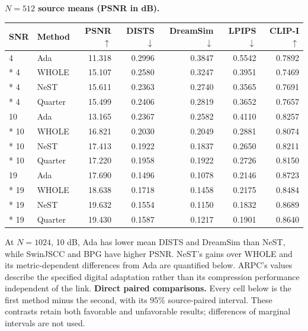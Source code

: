 \documentclass[10pt,letterpaper]{article}
\begin{document}
\textbf{$N=512$ source means (PSNR in dB).}\par
{\small\setlength{\tabcolsep}{3pt}\renewcommand{\arraystretch}{1.08}
\begin{longtable}{@{}llrrrrr@{}}\toprule
SNR & Method & PSNR $\uparrow$ & DISTS $\downarrow$ & DreamSim $\downarrow$ & LPIPS $\downarrow$ & CLIP-I $\uparrow$\\\midrule\endhead
4 & Ada & 11.318 & 0.2996 & 0.3847 & 0.5542 & 0.7892\\*
4 & WHOLE & 15.107 & 0.2580 & 0.3247 & 0.3951 & 0.7469\\*
4 & NeST & 15.611 & 0.2363 & 0.2740 & 0.3565 & 0.7691\\*
4 & Quarter & 15.499 & 0.2406 & 0.2819 & 0.3652 & 0.7657\\
10 & Ada & 13.165 & 0.2367 & 0.2582 & 0.4110 & 0.8257\\*
10 & WHOLE & 16.821 & 0.2030 & 0.2049 & 0.2881 & 0.8074\\*
10 & NeST & 17.413 & 0.1922 & 0.1837 & 0.2650 & 0.8211\\*
10 & Quarter & 17.220 & 0.1958 & 0.1922 & 0.2726 & 0.8150\\
19 & Ada & 17.690 & 0.1496 & 0.1078 & 0.2146 & 0.8723\\*
19 & WHOLE & 18.638 & 0.1718 & 0.1458 & 0.2175 & 0.8484\\*
19 & NeST & 19.632 & 0.1554 & 0.1150 & 0.1832 & 0.8689\\*
19 & Quarter & 19.430 & 0.1587 & 0.1217 & 0.1901 & 0.8640\\
\bottomrule\end{longtable}}
At $N=1024$, 10 dB, Ada has lower mean DISTS and DreamSim than NeST, while SwinJSCC and BPG have higher PSNR. NeST's gains over WHOLE and its metric-dependent differences from Ada are quantified below. ARPC's values describe the specified digital adaptation rather than its compression performance independent of the link.
\textbf{Direct paired comparisons.} Every cell below is the first method minus the second, with its 95\% source-paired interval. These contrasts retain both favorable and unfavorable results; differences of marginal intervals are not used.
\end{document}
